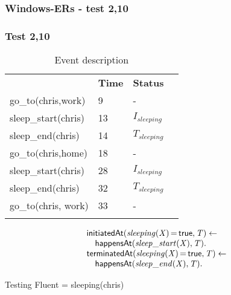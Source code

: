 \documentclass[8pt]{beamer}
\DeclareMathOperator{\val}{=}  %
\def \patsize {}
\def\happensAt{\textsf{\patsize happensAt}}
\def\initiatedAt{\textsf{\patsize initiatedAt}}
\def\terminatedAt{\textsf{\patsize terminatedAt}}
\def\true{\textsf{\patsize true}}
\newenvironment{mysplit}%
  {\arraycolsep 0pt \begin{array}{l}}%
  {\end{array}}
\begin{document}
\begin{frame}
    \frametitle{Windows-ERs - test 2,10}
    \subsubsection{Test 2,10}
    \small
    \begin{minipage}{0.48\linewidth}

        \begin{table}[t!]
            \caption{Event description}
            \begin{center}

                \begin{tabular}{llll}
                    \hline\noalign{\smallskip}
                    \multicolumn{1}{l}{\textbf{Event}} & \multicolumn{1}{c}{\textbf{Time}} & \multicolumn{1}{c}{\textbf{Status}}  \\
                    go\_to(chris,work)& 9 & -\\
                    sleep\_start(chris)& 13 &$I_{sleeping}$\\
                    sleep\_end(chris)& 14 &$T_{sleeping}$\\
                    go\_to(chris,home)& 18 &-\\
                    sleep\_start(chris)& 28 &$I_{sleeping}$\\
                    sleep\_end(chris)& 32& $T_{sleeping}$\\
                    go\_to(chris, work)& 33& -\\
                    \noalign{\smallskip}
                    \hline
                \end{tabular}
            \end{center}
        \end{table}
    \end{minipage}
    \begin{minipage}{0.48\linewidth}

        \begin{align*}
            \begin{mysplit}
                \initiatedAt\mathit{(sleeping(X)\val\true,T) \leftarrow}\\
                \quad    \happensAt\mathit{(sleep\_start(X),T).}\\
                \terminatedAt\mathit{(sleeping(X)\val\true,T) \leftarrow}\\
                \quad    \happensAt\mathit{(sleep\_end(X),T).}
            \end{mysplit}
        \end{align*}
    \end{minipage}
    Testing Fluent = sleeping(chris)


\end{frame}
\end{document}
